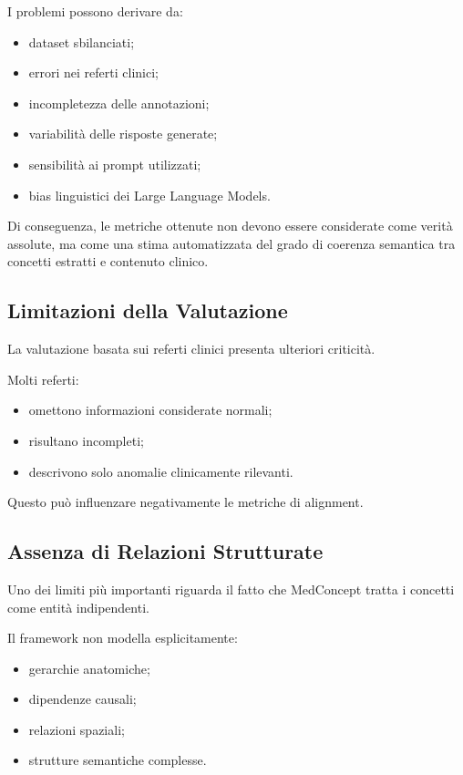 I problemi possono derivare da:

\begin{itemize}
    \item dataset sbilanciati;
    \item errori nei referti clinici;
    \item incompletezza delle annotazioni;
    \item variabilità delle risposte generate;
    \item sensibilità ai prompt utilizzati;
    \item bias linguistici dei Large Language Models.
\end{itemize}

Di conseguenza, le metriche ottenute non devono essere considerate come verità assolute, ma come una stima automatizzata del grado di coerenza semantica tra concetti estratti e contenuto clinico.

\subsection{Limitazioni della Valutazione}

La valutazione basata sui referti clinici presenta ulteriori criticità.

Molti referti:

\begin{itemize}
    \item omettono informazioni considerate normali;
    \item risultano incompleti;
    \item descrivono solo anomalie clinicamente rilevanti.
\end{itemize}

Questo può influenzare negativamente le metriche di alignment.

\subsection{Assenza di Relazioni Strutturate}

Uno dei limiti più importanti riguarda il fatto che MedConcept tratta i concetti come entità indipendenti.

Il framework non modella esplicitamente:

\begin{itemize}
    \item gerarchie anatomiche;
    \item dipendenze causali;
    \item relazioni spaziali;
    \item strutture semantiche complesse.
\end{itemize}

